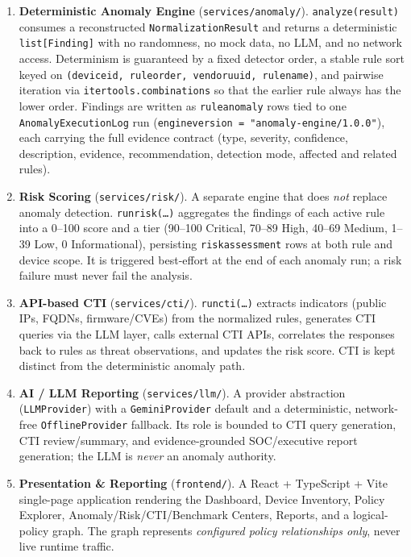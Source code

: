 \documentclass[12pt,a4paper]{report}
\renewcommand{\_}{\textunderscore\allowbreak}
\begin{document}
\begin{enumerate}[leftmargin=2.2em]
  \item \textbf{Deterministic Anomaly Engine} (\texttt{services/anomaly/}). \texttt{analyze(result)} consumes a reconstructed \texttt{NormalizationResult} and returns a deterministic \texttt{list[Finding]} with no randomness, no mock data, no LLM, and no network access. Determinism is guaranteed by a fixed detector order, a stable rule sort keyed on \texttt{(device\_id, rule\_order, vendor\_uuid, rule\_name)}, and pairwise iteration via \texttt{itertools.combinations} so that the earlier rule always has the lower order. Findings are written as \texttt{rule\_anomaly} rows tied to one \texttt{AnomalyExecutionLog} run (\texttt{engine\_version = "anomaly-engine/1.0.0"}), each carrying the full evidence contract (type, severity, confidence, description, evidence, recommendation, detection mode, affected and related rules).
  \item \textbf{Risk Scoring} (\texttt{services/risk/}). A separate engine that does \emph{not} replace anomaly detection. \texttt{run\_risk(\dots)} aggregates the findings of each active rule into a 0--100 score and a tier (90--100 Critical, 70--89 High, 40--69 Medium, 1--39 Low, 0 Informational), persisting \texttt{risk\_assessment} rows at both rule and device scope. It is triggered best-effort at the end of each anomaly run; a risk failure must never fail the analysis.
  \item \textbf{API-based CTI} (\texttt{services/cti/}). \texttt{run\_cti(\dots)} extracts indicators (public IPs, FQDNs, firmware/CVEs) from the normalized rules, generates CTI queries via the LLM layer, calls external CTI APIs, correlates the responses back to rules as threat observations, and updates the risk score. CTI is kept distinct from the deterministic anomaly path.
  \item \textbf{AI / LLM Reporting} (\texttt{services/llm/}). A provider abstraction (\texttt{LLMProvider}) with a \texttt{GeminiProvider} default and a deterministic, network-free \texttt{OfflineProvider} fallback. Its role is bounded to CTI query generation, CTI review/summary, and evidence-grounded SOC/executive report generation; the LLM is \emph{never} an anomaly authority.
  \item \textbf{Presentation \& Reporting} (\texttt{frontend/}). A React + TypeScript + Vite single-page application rendering the Dashboard, Device Inventory, Policy Explorer, Anomaly/Risk/CTI/Benchmark Centers, Reports, and a logical-policy graph. The graph represents \emph{configured policy relationships only}, never live runtime traffic.
\end{enumerate}
\end{document}
